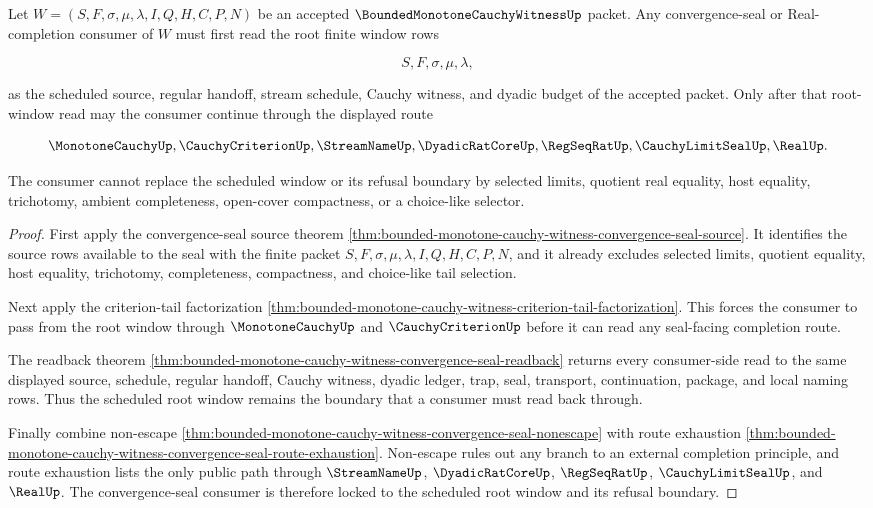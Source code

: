 \begin{theorem}
\label{thm:bounded-monotone-cauchy-witness-root-window-convergence-seal-lock}
Let $W=(S,F,\sigma,\mu,\lambda,I,Q,H,C,P,N)$ be an accepted $\BoundedMonotoneCauchyWitnessUp$ packet. Any convergence-seal or Real-completion consumer of $W$ must first read the root finite window rows

$$
S,F,\sigma,\mu,\lambda,
$$

as the scheduled source, regular handoff, stream schedule, Cauchy witness, and dyadic budget of the accepted packet. Only after that root-window read may the consumer continue through the displayed route

$$
\MonotoneCauchyUp,\CauchyCriterionUp,\StreamNameUp,\DyadicRatCoreUp,\RegSeqRatUp,\CauchyLimitSealUp,\RealUp.
$$

The consumer cannot replace the scheduled window or its refusal boundary by selected limits, quotient real equality, host equality, trichotomy, ambient completeness, open-cover compactness, or a choice-like selector.
\end{theorem}
\begin{proof}
First apply the convergence-seal source theorem \autoref{thm:bounded-monotone-cauchy-witness-convergence-seal-source}. It identifies the source rows available to the seal with the finite packet $S,F,\sigma,\mu,\lambda,I,Q,H,C,P,N$, and it already excludes selected limits, quotient equality, host equality, trichotomy, completeness, compactness, and choice-like tail selection.

Next apply the criterion-tail factorization \autoref{thm:bounded-monotone-cauchy-witness-criterion-tail-factorization}. This forces the consumer to pass from the root window through $\MonotoneCauchyUp$ and $\CauchyCriterionUp$ before it can read any seal-facing completion route.

The readback theorem \autoref{thm:bounded-monotone-cauchy-witness-convergence-seal-readback} returns every consumer-side read to the same displayed source, schedule, regular handoff, Cauchy witness, dyadic ledger, trap, seal, transport, continuation, package, and local naming rows. Thus the scheduled root window remains the boundary that a consumer must read back through.

Finally combine non-escape \autoref{thm:bounded-monotone-cauchy-witness-convergence-seal-nonescape} with route exhaustion \autoref{thm:bounded-monotone-cauchy-witness-convergence-seal-route-exhaustion}. Non-escape rules out any branch to an external completion principle, and route exhaustion lists the only public path through $\StreamNameUp$, $\DyadicRatCoreUp$, $\RegSeqRatUp$, $\CauchyLimitSealUp$, and $\RealUp$. The convergence-seal consumer is therefore locked to the scheduled root window and its refusal boundary.
\end{proof}

